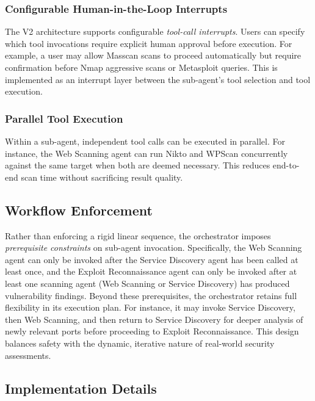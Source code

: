 \documentclass[sigconf,anonymous]{acmart}
\begin{document}
\subsubsection{Configurable Human-in-the-Loop Interrupts}

The V2 architecture supports configurable \emph{tool-call interrupts}. Users can specify which tool invocations require explicit human approval before execution. For example, a user may allow Masscan scans to proceed automatically but require confirmation before Nmap aggressive scans or Metasploit queries. This is implemented as an interrupt layer between the sub-agent's tool selection and tool execution.

\subsubsection{Parallel Tool Execution}

Within a sub-agent, independent tool calls can be executed in parallel. For instance, the Web Scanning agent can run Nikto and WPScan concurrently against the same target when both are deemed necessary. This reduces end-to-end scan time without sacrificing result quality.

\subsection{Workflow Enforcement}

Rather than enforcing a rigid linear sequence, the orchestrator imposes \emph{prerequisite constraints} on sub-agent invocation. Specifically, the Web Scanning agent can only be invoked after the Service Discovery agent has been called at least once, and the Exploit Reconnaissance agent can only be invoked after at least one scanning agent (Web Scanning or Service Discovery) has produced vulnerability findings. Beyond these prerequisites, the orchestrator retains full flexibility in its execution plan. For instance, it may invoke Service Discovery, then Web Scanning, and then return to Service Discovery for deeper analysis of newly relevant ports before proceeding to Exploit Reconnaissance. This design balances safety
with the dynamic, iterative nature of real-world security assessments.

\subsection{Implementation Details}
\label{sec:implementation}
\end{document}
